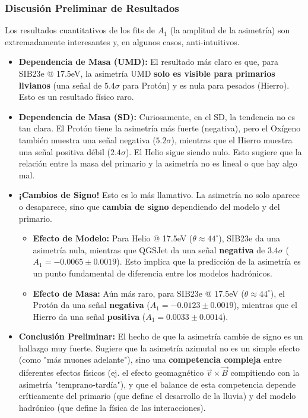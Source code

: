 \subsubsection*{Discusión Preliminar de Resultados}

Los resultados cuantitativos de los fits de $A_1$ (la amplitud de la asimetría) son extremadamente interesantes y, en algunos casos, anti-intuitivos.

\begin{itemize}
	\item \textbf{Dependencia de Masa (UMD):} El resultado más claro es que, para SIB23e @ 17.5eV, la asimetría UMD \textbf{solo es visible para primarios livianos} (una señal de $5.4\sigma$ para Protón) y es nula para pesados (Hierro). Esto es un resultado físico raro.
	
	\item \textbf{Dependencia de Masa (SD):} Curiosamente, en el SD, la tendencia no es tan clara. El Protón tiene la asimetría más fuerte (negativa), pero el Oxígeno también muestra una señal negativa ($5.2\sigma$), mientras que el Hierro muestra una señal positiva débil ($2.4\sigma$). El Helio sigue siendo nulo. Esto sugiere que la relación entre la masa del primario y la asimetría no es lineal o que hay algo mal.
	
	\item \textbf{¡Cambios de Signo!} Esto es lo más llamativo. La asimetría no solo aparece o desaparece, sino que \textbf{cambia de signo} dependiendo del modelo y del primario.
	\begin{itemize}
		\item \textbf{Efecto de Modelo:} Para Helio @ 17.5eV ($\theta \approx 44^\circ$), SIB23e da una asimetría nula, mientras que QGSJet da una señal \textbf{negativa} de $3.4\sigma$ ($A_1 = -0.0065 \pm 0.0019$). Esto implica que la predicción de la asimetría es un punto fundamental de diferencia entre los modelos hadrónicos.
		\item \textbf{Efecto de Masa:} Aún más raro, para SIB23e @ 17.5eV ($\theta \approx 44^\circ$), el Protón da una señal \textbf{negativa} ($A_1 = -0.0123 \pm 0.0019$), mientras que el Hierro da una señal \textbf{positiva} ($A_1 = 0.0033 \pm 0.0014$). 
	\end{itemize}
	
	\item \textbf{Conclusión Preliminar:} El hecho de que la asimetría cambie de signo es un hallazgo muy fuerte. Sugiere que la asimetría azimutal no es un simple efecto (como "más muones adelante"), sino una \textbf{competencia compleja} entre diferentes efectos físicos (ej. el efecto geomagnético $\vec{v} \times \vec{B}$ compitiendo con la asimetría "temprano-tardía"), y que el balance de esta competencia depende críticamente del primario (que define el desarrollo de la lluvia) y del modelo hadrónico (que define la física de las interacciones).
\end{itemize}

